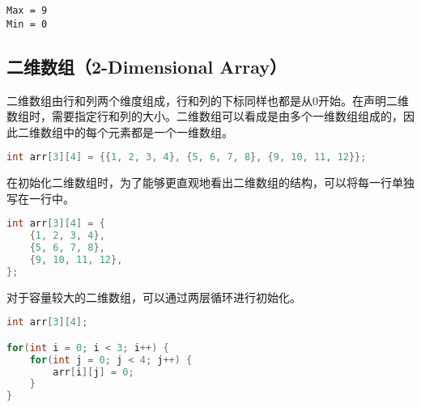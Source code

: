 \begin{tcolorbox}
	\begin{verbatim}
Max = 9
Min = 0
	\end{verbatim}
\end{tcolorbox}

\vspace{0.5cm}

\subsection{二维数组（2-Dimensional Array）}

二维数组由行和列两个维度组成，行和列的下标同样也都是从0开始。在声明二维数组时，需要指定行和列的大小。二维数组可以看成是由多个一维数组组成的，因此二维数组中的每个元素都是一个一维数组。

\vspace{-0.5cm}

\begin{lstlisting}[language=C]
int arr[3][4] = {{1, 2, 3, 4}, {5, 6, 7, 8}, {9, 10, 11, 12}};
\end{lstlisting}

\begin{table}[H]
	\centering
\end{table}

在初始化二维数组时，为了能够更直观地看出二维数组的结构，可以将每一行单独写在一行中。

\vspace{-0.5cm}

\begin{lstlisting}[language=C]
int arr[3][4] = {
	{1, 2, 3, 4},
	{5, 6, 7, 8},
	{9, 10, 11, 12},
};
\end{lstlisting}

对于容量较大的二维数组，可以通过两层循环进行初始化。

\vspace{-0.5cm}

\begin{lstlisting}[language=C]
int arr[3][4];

for(int i = 0; i < 3; i++) {
	for(int j = 0; j < 4; j++) {
		arr[i][j] = 0;
	}
}
\end{lstlisting}


